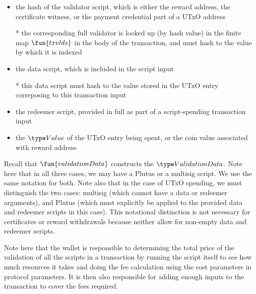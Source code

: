 \begin{itemize}
\item the hash of the validator script, which is either the reward address,
the certificate witness, or the payment credential part of a UTxO address

* the corresponding
full validator is looked up (by hash value) in the finite map $\fun{txvlds}$ in the
body of the transaction, and must hash to the value by which it is indexed

\item the data script, which is included in the script input

* this data script must hash to the value stored in the UTxO entry correposing to
this transaction input

\item the redeemer script, provided in full as part of a script-spending
transaction input

\item the $\Value$ of the UTxO entry being spent, or the coin value associated
with reward address
\end{itemize}

Recall that $\fun{validationData}$ constructs the $\ValidationData$.
Note here that in all three cases, we may have a Plutus or a multisig script.
We use the same notation for both. Note also that in the case of UTxO
spending, we must distinguish the two cases: multisig (which cannot
have a data or redeemer arguments), and Plutus (which must explicitly be
applied to the provided data and redeemer scripts in this case).
This notational distinction is not necessary for certificates or reward withdrawals
because neither allow for non-empty data and redeemer scripts.

Note here that the wallet is responsible to determining the total price of the
validation of all the scripts in a transaction
by running the script itself to see how much resources it takes and doing the
fee calculation using the cost parameters in protocol parameters. It is then
also responsible for adding enough inputs to the transaction to cover the
fees required.

